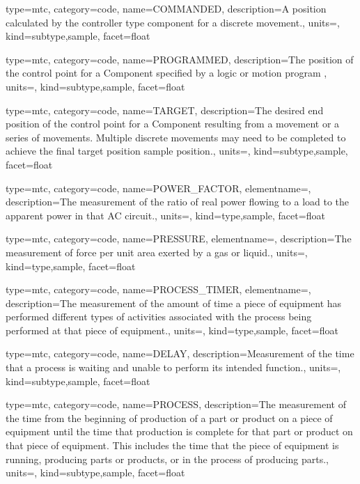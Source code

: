 {
  type=mtc,
  category=code,
  name={COMMANDED},
  description={A position calculated by the \gls{controller} type component for a discrete movement.},
  units=,
  kind={subtype,sample},
  facet={\gls{float}}
}


{
  type=mtc,
  category=code,
  name={PROGRAMMED},
  description={The position of the control point for a Component specified by a logic or motion program },
  units=,
  kind={subtype,sample},
  facet={\gls{float}}
}


{
  type=mtc,
  category=code,
  name={TARGET},
  description={The desired end position of the control point for a Component resulting from a movement or a series of movements.  Multiple discrete movements may need to be completed to achieve the final \gls{target position sample} position.},
  units=,
  kind={subtype,sample},
  facet={\gls{float}}
}


{
  type=mtc,
  category=code,
  name={POWER\_FACTOR},
  elementname=,
  description={The measurement of the ratio of real power flowing to a load to the apparent power in that AC circuit.},
  units=,
  kind={type,sample},
  facet={\gls{float}}
}


{
  type=mtc,
  category=code,
  name={PRESSURE},
  elementname=,
  description={The measurement of force per unit area exerted by a gas or liquid.},
  units=,
  kind={type,sample},
  facet={\gls{float}}
}


{
  type=mtc,
  category=code,
  name={PROCESS\_TIMER},
  elementname=,
  description={The measurement of the amount of time a piece of equipment has performed different types of activities associated with the process being performed at that piece of equipment.},
  units=,
  kind={type,sample},
  facet={\gls{float}}
}


{
  type=mtc,
  category=code,
  name={DELAY},
  description={Measurement of the time that a process is waiting and unable to perform its intended function.},
  units=,
  kind={subtype,sample},
  facet={\gls{float}}
}


{
  type=mtc,
  category=code,
  name={PROCESS},
  description={The measurement of the time from the beginning of production of a part or product on a piece of equipment until the time that production is complete for that part or product on that piece of equipment.  This includes the time that the piece of equipment is running, producing parts or products, or in the process of producing parts.},
  units=,
  kind={subtype,sample},
  facet={\gls{float}}
}


